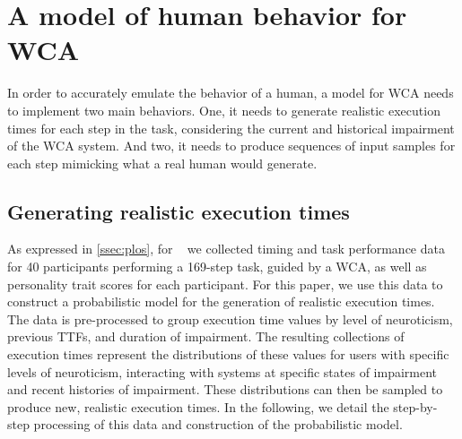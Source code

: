 \section{A model of human behavior for \ac{WCA}}\label{sec:model}


In order to accurately emulate the behavior of a human, a model for \ac{WCA} needs to implement two main behaviors.
One, it needs to generate realistic execution times for each step in the task, considering the current and historical impairment of the \ac{WCA} system.
And two, it needs to produce sequences of input samples for each step mimicking what a real human would generate.

\subsection{Generating realistic execution times}

As expressed in \cref{ssec:plos}, for ~\cite{olguinmunoz:impact2021} we collected timing and task performance data for \num{40} participants performing a \num{169}-step task, guided by a \ac{WCA}, as well as personality trait scores for each participant.
For this paper, we use this data to construct a probabilistic model for the generation of realistic execution times.
The data is pre-processed to group execution time values by level of neuroticism, previous \acp{TTF}, and duration of impairment.
The resulting collections of execution times represent the distributions of these values for users with specific levels of neuroticism, interacting with systems at specific states of impairment and recent histories of impairment.
These distributions can then be sampled to produce new, realistic execution times.
In the following, we detail the step-by-step processing of this data and construction of the probabilistic model.

